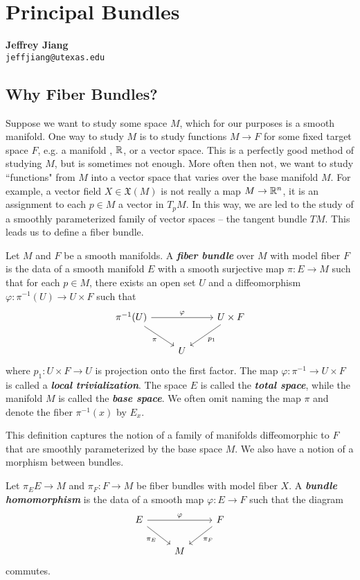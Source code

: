 \documentclass[abstract=on,twoside]{scrreprt}
\begin{document}
\chapter{Principal Bundles} %
\thispagestyle{empty}
\vspace{-2cm}
%
\begin{flushright}
	\textbf{Jeffrey Jiang}\\ %
	\texttt{jeffjiang@utexas.edu} %
\end{flushright}
%

\section*{Why Fiber Bundles?}

Suppose we want to study some space $M$, which for our purposes is a smooth manifold.
One way to study $M$ is to study functions $M \to F$ for some fixed target space $F$,
e.g. a manifold , $\mathbb{R}$, or a vector space. This is a perfectly good method
of studying $M$, but is sometimes not enough. More often then not, we want to
study ``functions" from $M$ into a vector space that varies over the base
manifold $M$. For example, a vector field $X \in \mathfrak{X}(M)$ is not really
a map $M \to \mathbb{R}^n$, it is an assignment to each $p \in M$ a vector in $T_pM$.
In this way, we are led to the study of a smoothly parameterized family of
vector spaces -- the tangent bundle $TM$. This leads us to define a fiber bundle.
%
\begin{definition}
Let $M$ and $F$ be a smooth manifolds. A \textbf{\textit{fiber bundle}} over $M$ with
model fiber $F$ is the data of a smooth manifold $E$ with a smooth surjective map
$\pi : E \to M$ such that for each $p \in M$, there exists an open set $U$ and a
diffeomorphism $\varphi : \pi^{-1}(U) \to U \times F$ such that
\[\begin{tikzcd}
\pi^{-1}(U) \ar[dr, "\pi"']\ar[rr, "\varphi"] && U \times F \ar[dl, "p_1"] \\
& U
\end{tikzcd}\]
where $p_1 : U \times F \to U$ is projection onto the first factor. The map
$\varphi : \pi^{-1} \to U \times F$ is called a \textbf{\textit{local trivialization}}.
The space $E$ is called the \textbf{\textit{total space}}, while the manifold $M$
is called the \textbf{\textit{base space}}. We often omit naming the map $\pi$
and denote the fiber $\pi^{-1}(x)$ by $E_x$.
\end{definition}
%
This definition captures the notion of a family of manifolds diffeomorphic to $F$ that
are smoothly parameterized by the base space $M$. We also have a notion of a morphism
between bundles.
%
\begin{definition}
Let $\pi_E E \to M$ and $\pi_F : F \to M$ be fiber bundles with model fiber $X$. A
\textbf{\textit{bundle homomorphism}} is the data of a smooth map $\varphi : E \to F$
such that the diagram
\[\begin{tikzcd}
E \ar[dr, "\pi_E"']\ar[rr, "\varphi"] && F \ar[dl, "\pi_F"]\\
& M
\end{tikzcd}\]
commutes.
\end{definition}
\end{document}
